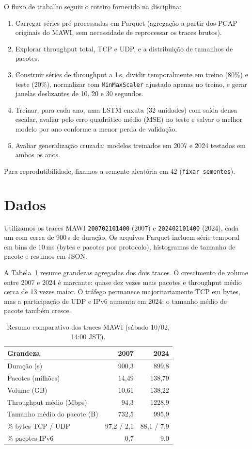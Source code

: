 \documentclass[12pt,a4paper]{article}
\begin{document}
O fluxo de trabalho seguiu o roteiro fornecido na disciplina:
\begin{enumerate}
  \item Carregar séries pré-processadas em Parquet (agregação a partir dos PCAP originais
        do MAWI, sem necessidade de reprocessar os traces brutos).
  \item Explorar throughput total, TCP e UDP, e a distribuição de tamanhos de pacotes.
  \item Construir séries de throughput a 1\,s, dividir temporalmente em treino (80\%)
        e teste (20\%), normalizar com \texttt{MinMaxScaler} ajustado apenas no treino,
        e gerar janelas deslizantes de 10, 20 e 30 segundos.
  \item Treinar, para cada ano, uma LSTM enxuta (32 unidades) com saída densa escalar,
        avaliar pelo erro quadrático médio (MSE) no teste e salvar o melhor modelo por
        ano conforme a menor perda de validação.
  \item Avaliar generalização cruzada: modelos treinados em 2007 e 2024 testados em ambos
        os anos.
\end{enumerate}

Para reprodutibilidade, fixamos a semente aleatória em 42 (\texttt{fixar\_sementes}).

\section{Dados}

Utilizamos os traces MAWI \texttt{200702101400} (2007) e \texttt{202402101400} (2024),
cada um com cerca de 900\,s de duração. Os arquivos Parquet incluem série temporal em
bins de 10\,ms (bytes e pacotes por protocolo), histogramas de tamanho de pacote e
resumos em JSON.

A Tabela~\ref{tab:resumo} resume grandezas agregadas dos dois traces. O crescimento de
volume entre 2007 e 2024 é marcante: quase dez vezes mais pacotes e throughput médio
cerca de 13 vezes maior. O tráfego permanece majoritariamente TCP em bytes, mas a
participação de UDP e IPv6 aumenta em 2024; o tamanho médio de pacote também cresce.

\begin{table}[htbp]
  \centering
  \caption{Resumo comparativo dos traces MAWI (sábado 10/02, 14:00 JST).}
  \label{tab:resumo}
  \begin{tabular}{lrr}
    \toprule
    Grandeza & 2007 & 2024 \\
    \midrule
    Duração (s) & 900,3 & 899,8 \\
    Pacotes (milhões) & 14,49 & 138,79 \\
    Volume (GB) & 10,61 & 138,22 \\
    Throughput médio (Mbps) & 94,3 & 1228,9 \\
    Tamanho médio do pacote (B) & 732,5 & 995,9 \\
    \% bytes TCP / UDP & 97,2 / 2,1 & 88,1 / 7,9 \\
    \% pacotes IPv6 & 0,7 & 9,0 \\
    \bottomrule
  \end{tabular}
\end{table}
\end{document}
